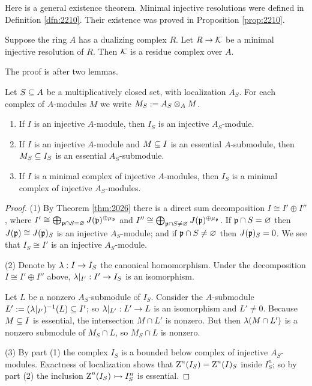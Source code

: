 Here is a general existence theorem. 
Minimal injective resolutions were defined in Definition \ref{dfn:2210}.
Their existence was proved in Proposition \ref{prop:2210}. 

\begin{thm} \label{thm:2245}
Suppose the ring $A$ has a dualizing complex $R$. 
Let $R \to \mathcal{K}$ be a minimal injective resolution of $R$. Then $\mathcal{K}$ is a 
residue complex over $A$. 
\end{thm}

The proof is after two lemmas. 

\begin{lem} \label{lem:2230}
Let $S \subseteq A$ be a multiplicatively closed set, with localization $A_S$. 
For each complex of $A$-modules $M$ we write $M_S := A_S \otimes_A M$.
\begin{enumerate}
\item If $I$ is an injective $A$-module, then $I_S$ is an 
injective $A_S$-module.

\item If $I$ is an injective $A$-module and $M \subseteq I$ is an essential 
$A$-submodule, then $M_S \subseteq I_S$ is an essential $A_S$-submodule.

\item If $I$ is a minimal complex of injective $A$-modules, then 
$I_S$ is a minimal complex of injective $A_S$-modules.
\end{enumerate}
\end{lem}

\begin{proof}
(1) By Theorem \ref{thm:2026} there is a direct sum decomposition 
$I \cong I' \oplus I''$, where 
$I' \cong \bigoplus_{\mathfrak{p} \cap S = \varnothing}  
J(\mathfrak{p})^{\oplus \mu_{\mathfrak{p}}}$
and 
$I'' \cong \bigoplus_{\mathfrak{p} \cap S \neq \varnothing} 
J(\mathfrak{p})^{\oplus \mu_{\mathfrak{p}}}$.
If $\mathfrak{p} \cap S = \varnothing$ then $J(\mathfrak{p}) \cong J(\mathfrak{p})_S$ is an injective 
$A_S$-module; and if $\mathfrak{p} \cap S \neq \varnothing$ then $J(\mathfrak{p})_S = 0$. 
We see that $I_S \cong I'$ is  an injective $A_S$-module.

\medskip \noindent 
(2) Denote by $\lambda : I \to I_S$ the canonical homomorphism. 
Under the decomposition $I \cong I' \oplus I''$ above, 
$\lambda|_{I'} : I' \to I_S$ is an isomorphism. 

Let $L$ be a nonzero $A_S$-submodule of $I_S$. 
Consider the $A$-submodule 
$L' := (\lambda|_{I'})^{-1}(L) \subseteq I'$;
so $\lambda|_{L'} : L' \to L$ is an isomorphism and $L' \neq 0$.  
Because $M \subseteq I$ is essential, the intersection $M \cap L'$ is 
nonzero. But then $\lambda(M \cap L')$ is a nonzero submodule of 
$M_S \cap L$, so $M_S \cap L$ is nonzero. 

\medskip \noindent 
(3) By part (1) the complex $I_S$ is a bounded below complex of injective 
$A_S$-modules. Exactness of localization shows that 
$\operatorname{Z}^n(I_S) = \operatorname{Z}^n(I)_S$ inside $I^n_S$; so by part (2) the inclusion 
$\operatorname{Z}^n(I_S) \rightarrowtail I^n_S$ is essential.
\end{proof}


